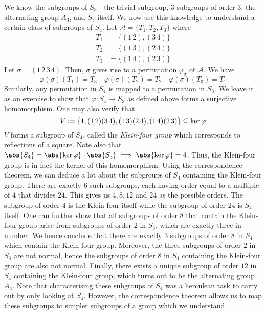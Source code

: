 We know the subgroups of $S_3$ - the trivial subgroup, $3$ subgroups of order $3$, the alternating group $A_3$, and $S_3$ itself. We now use this knowledge to understand a certain class of subgroups of $S_4$. Let $\mathcal{A} = \{T_1, T_2, T_3\}$ where
\begin{align*}
    T_1 &= \{ (1 \, 2), (3 \, 4) \} \\
    T_2 &= \{ (1 \, 3), (2 \, 4) \} \\
    T_3 &= \{ (1 \, 4), (2 \, 3) \}
\end{align*}
Let $\sigma = (1\,2 \, 3\, 4)$. Then, $\sigma$ gives rise to a permutation $\varphi_{\sigma}$ of $\mathcal{A}$. We have
\[
    \varphi(\sigma)(T_1) = T_3 \quad \varphi(\sigma)(T_2) = T_2 \quad \varphi(\sigma)(T_3) = T_1
\]
Similarly, any permutation in $S_4$ is mapped to a permutation in $S_3$. We leave it as an exercise to show that $\varphi \colon S_4 \to S_3$ as defined above forms a surjective homomorphism. One may also verify that 
\[
    V \vcentcolon= \{ 1, (1\, 2)(3\, 4), (1\, 3)(2\, 4), (1\, 4)(2\, 3) \} \subseteq \ker\varphi
\]
$V$ forms a subgroup of $S_4$, called the \emph{Klein-four group} which corresponds to reflections of a square. Note also that $\abs{S_4} = \abs{\ker\varphi} \cdot \abs{S_3} \implies \abs{\ker\varphi} = 4$. Thus, the Klein-four group is in fact the kernel of this homomorphism. Using the correspondence theorem, we can deduce a lot about the subgroups of $S_4$ containing the Klein-four group. There are exactly $6$ such subgroups, each having order equal to a multiple of $4$ that divides $24$. This gives us $4,8,12$ and $24$ as the possible orders. The subgroup of order $4$ is the Klein-four itself while the subgroup of order $24$ is $S_4$ itself. One can further show that all subgroups of order $8$ that contain the Klein-four group arise from subgroups of order $2$ in $S_3$, which are exactly three in number. We hence conclude that there are exactly $3$ subgroups of order $8$ in $S_4$ which contain the Klein-four group. Moreover, the three subgroups of order $2$ in $S_3$ are not normal, hence the subgroups of order $8$ in $S_4$ containing the Klein-four group are also not normal. Finally, there exists a unique subgroup of order $12$ in $S_4$ containing the Klein-four group, which turns out to be the alternating group $A_4$. Note that characterising these subgroups of $S_4$ was a herculean task to carry out by only looking at $S_4$. However, the correspondence theorem allows us to map these subgroups to simpler subgroups of a group which we understand.